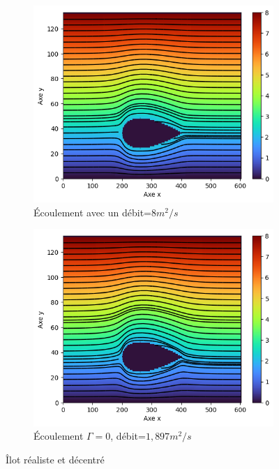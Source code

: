 \documentclass{article}
\begin{document}
 \begin{figure}[!h]
\begin{center}
     \begin{subfigure}[b]{0.45\textwidth}
     \includegraphics[width=1\textwidth]{"../pictures/stream4.png"}
     \caption{ Écoulement avec un débit=$8m^2/s$}
     \end{subfigure}
     \hfill
     \begin{subfigure}[b]{0.45\textwidth}
     \includegraphics[width=1\textwidth]{"../pictures/stream5.png"}
     \caption{ Écoulement $\Gamma=0$, débit=$1,897 m^2/s$}
     \end{subfigure}
      \caption{ Îlot réaliste et décentré }

\end{center}
 \end{figure}
\end{document}
